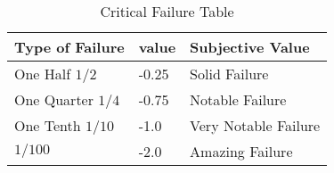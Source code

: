 \begin{table}[h]
	\begin{tabular}{l|l|l}
	Type of Failure				& value & Subjective Value	\\
	\hline
	One Half \( 1/2 \)			& -0.25	& Solid Failure		\\
        One Quarter \( 1/4 \) 	& -0.75	& Notable Failure	\\
        One Tenth \( 1/10 \) 	& -1.0	& Very Notable Failure	\\
        \(1/100\) 				& -2.0	& Amazing Failure	\\
    \end{tabular}
	\caption{Critical Failure Table}\label{Table:CriticalFailure}
\end{table}

